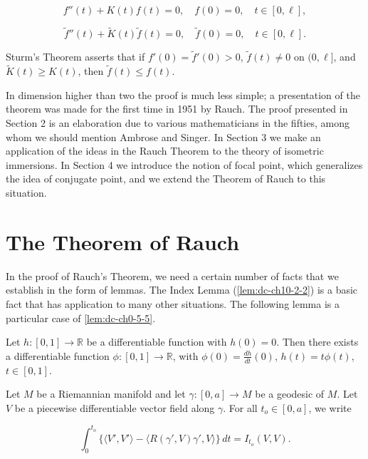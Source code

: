 $$
f''(t)+K(t)f(t)=0,\quad f(0)=0,\quad t\in[0,\ell],
$$

$$
\tilde f''(t)+\widetilde{K}(t)\tilde f(t)=0,\quad\tilde f(0)=0,\quad t\in[0,\ell].
$$

Sturm's Theorem asserts that if $f'(0)=\tilde f'(0)>0$, $\tilde f(t)\neq 0$ on
$(0,\ell]$, and $\widetilde{K}(t)\geq K(t)$, then $\tilde f(t)\leq f(t)$.

In dimension higher than two the proof is much less simple; a presentation of
the theorem was made for the first time in 1951 by Rauch. The proof presented in
Section 2 is an elaboration due to various mathematicians in the fifties, among
whom we should mention Ambrose and Singer. In Section 3 we make an application of
the ideas in the Rauch Theorem to the theory of isometric immersions. In Section
4 we introduce the notion of focal point, which generalizes the idea of
conjugate point, and we extend the Theorem of Rauch to this situation.

\section{The Theorem of Rauch}

In the proof of Rauch's Theorem, we need a certain number of facts that we
establish in the form of lemmas. The Index Lemma (\cref{lem:dc-ch10-2-2}) is a basic fact
that has application to many other situations. The following lemma is a
particular case of \cref{lem:dc-ch0-5-5}.

\begin{lemma}[Lemma 2.1]
  \label{lem:dc-ch10-2-1}
  Let $h:[0,1]\to\mathbb{R}$ be a differentiable function with $h(0)=0$. Then there
  exists a differentiable function $\phi:[0,1]\to\mathbb{R}$, with
  $\phi(0)=\frac{dh}{dt}(0)$, $h(t)=t\phi(t)$, $t\in[0,1]$.
  
  Let $M$ be a Riemannian manifold and let $\gamma:[0,a]\to M$ be a geodesic of
  $M$. Let $V$ be a piecewise differentiable vector field along $\gamma$. For all
  $t_o\in[0,a]$, we write
  
  $$
  \int_0^{t_o}\{\langle V',V'\rangle-\langle R(\gamma',V)\gamma',V\rangle\}\,dt=I_{t_o}(V,V).
  $$
\end{lemma}

